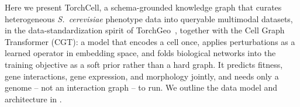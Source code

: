 Here we present TorchCell, a schema-grounded knowledge graph that curates heterogeneous
\textit{S.\ cerevisiae} phenotype data into queryable multimodal datasets, in the
data-standardization spirit of TorchGeo~\cite{stewartTorchGeoDeepLearning2022a}, together with the Cell
Graph Transformer (CGT): a model that encodes a cell once, applies perturbations as a learned
operator in embedding space, and folds biological networks into the training objective as a
soft prior rather than a hard graph. It predicts fitness, gene interactions, gene expression,
and morphology jointly, and needs only a genome -- not an interaction graph -- to run. We
outline the data model and architecture in .
